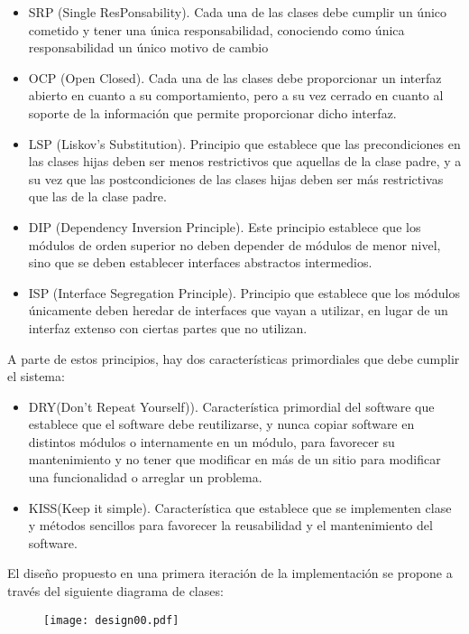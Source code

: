 \documentclass[11pt]{article}
\begin{document}
\begin{itemize}
\item{SRP (Single ResPonsability)}. Cada una de las clases debe cumplir un único cometido y tener una única responsabilidad, conociendo como única responsabilidad un único motivo de cambio
\item{OCP (Open Closed)}. Cada una de las clases debe proporcionar un interfaz abierto en cuanto a su comportamiento, pero a su vez cerrado en cuanto al soporte de la información que permite proporcionar dicho interfaz.
\item{LSP (Liskov's Substitution)}. Principio que establece que las precondiciones en las clases hijas deben ser menos restrictivos que aquellas de la clase padre, y a su vez que las postcondiciones de las clases hijas deben ser más restrictivas que las de la clase padre.
\item{DIP (Dependency Inversion Principle)}. Este principio establece que los módulos de orden superior no deben depender de módulos de menor nivel, sino que se deben establecer interfaces abstractos intermedios.
\item{ISP (Interface Segregation Principle)}. Principio que establece que los módulos únicamente deben heredar de interfaces que vayan a utilizar, en lugar de un interfaz extenso con ciertas partes que no utilizan.
\end{itemize}

A parte de estos principios, hay dos características primordiales que debe cumplir el sistema:
\begin{itemize}
\item{DRY(Don't Repeat Yourself))}. Característica primordial del software que establece que el software debe reutilizarse, y nunca copiar software en distintos módulos o internamente en un módulo, para favorecer su mantenimiento y no tener que modificar en más de un sitio para modificar una funcionalidad o arreglar un problema.
\item{KISS(Keep it simple)}. Característica que establece que se implementen clase y métodos sencillos para favorecer la reusabilidad y el mantenimiento del software.
\end{itemize}

El diseño propuesto en una primera iteración de la implementación se propone a través del siguiente diagrama de clases:

\begin{landscape}
\begin{center}
 \begin{figure}[H]
 \begin{center}
\texttt{[image: design00.pdf]}
   \label{fig:design}
 \end{center}
 \end{figure}
\end{center}
\end{landscape}
\restoregeometry
\end{document}
